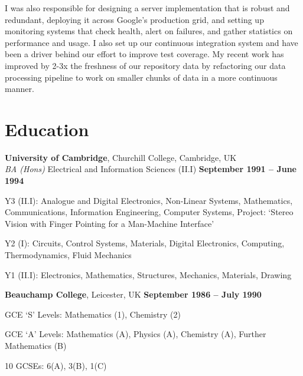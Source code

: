\documentclass[margin,line]{resume}
\begin{document}
\begin{resume}
    I was also responsible for designing a
    server implementation that is robust and redundant, deploying it across Google's production grid, and setting up
    monitoring systems that check health, alert on failures, and gather statistics on performance and usage.  I also set up
    our continuous integration system and have been a driver behind our effort to improve test coverage.  My recent work
    has improved by 2-3x the freshness of our repository data by refactoring our data processing pipeline to work on
    smaller chunks of data in a more continuous manner.


    \section{\mysidestyle Education}

    \textbf{University of Cambridge}, Churchill College, Cambridge, UK \vspace{2mm}\\\vspace{1mm}%
    \textsl{BA (Hons)} Electrical and Information Sciences (II.I)\hfill \textbf{ September 1991 -- June 1994}\vspace{-3mm}\\\vspace{-1mm}%
    \begin{list2}
        \item Y3 (II.I): Analogue and Digital Electronics, Non-Linear Systems, 
            Mathematics, Communications, Information Engineering, Computer 
            Systems, Project: `Stereo Vision with Finger Pointing for a Man-Machine Interface'
        \item Y2 (I): Circuits, Control Systems, Materials, Digital Electronics, 
            Computing, Thermodynamics, Fluid Mechanics
        \item Y1 (II.I): Electronics, Mathematics, Structures, Mechanics, Materials,  Drawing
    \end{list2}\vspace{-1.5mm}

    \textbf{Beauchamp College}, Leicester, UK\hfill \textbf{ September 1986 -- July 1990}\vspace{-3mm}\\\vspace{-1mm}%
    \begin{list2}
        \item GCE `S' Levels: Mathematics (1), Chemistry (2)
        \item GCE `A' Levels: Mathematics (A), Physics (A), Chemistry (A), Further Mathematics (B)
        \item 10 GCSEs: 6(A), 3(B), 1(C)
    \end{list2}\vspace{-1.5mm}
 


\end{resume}
\end{document}
